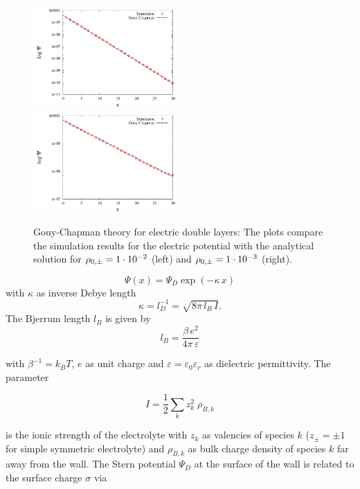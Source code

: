 \begin{figure}[htpb]
\includegraphics[width=0.495\textwidth]{./pics/test1.pdf}
\includegraphics[width=0.495\textwidth]{./pics/test2.pdf}
\caption{Gouy-Chapman theory for electric double layers: The plots compare the simulation results for the electric potential with the analytical solution for $\rho_{0,\pm}=1\cdot10^{-2}$ (left) and $\rho_{0,\pm}=1\cdot10^{-3}$ (right).} 
\label{fig1} 
\end{figure}


\begin{equation}\label{gouychapman}
\Psi(x) = \Psi_D \exp(-\kappa\, x)
\end{equation}
with $\kappa$ as inverse Debye length 
\begin{equation}
\kappa = l_D^{-1} = \sqrt{8\pi\, l_B \, I}.
\end{equation}
The Bjerrum length $l_B$ is given by 
\begin{equation}
l_B = \frac{\beta\,e^2}{4\pi\,\varepsilon}
\end{equation} 

with $\beta^{-1}=k_B T$, $e$ as unit charge and $\varepsilon=\varepsilon_0\varepsilon_r$ 
as dielectric permittivity.
The parameter 

\begin{equation}
I = \frac{1}{2}\sum_k z_k^2\; \rho_{B,k}
\end{equation} 

is the ionic strength 
of the electrolyte with $z_k$ as valencies of species $k$
($z_\pm=\pm 1$ for simple symmetric electrolyte) and $\rho_{B,k}$ as 
bulk charge density of species $k$ far away from the wall.
The Stern potential $\Psi_D$ at the surface of the wall is related 
to the surface charge $\sigma$ via

